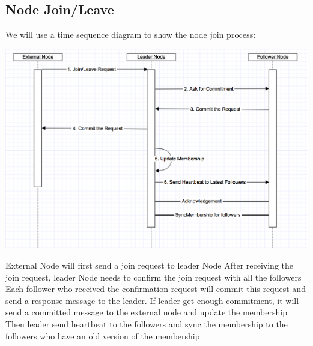 \documentclass[a4paper,11pt]{article}
\begin{document}
\subsection{Node Join/Leave}
We will use a time sequence diagram to show the node join process: 

\begin{center}
    \includegraphics[scale=0.5]{assets/nodeJoin}
\end{center}

\begin{outline}
\1 External Node will first send a join request to leader Node
\1 After receiving the join request, leader Node needs to confirm the join request with all the followers
\1 Each follower who received the confirmation request will commit this request and send a response message to the leader.
\1 If leader get enough commitment, it will send a committed message to the external node and update the membership
\1 Then leader send heartbeat to the followers and sync the membership to the followers who have an old version of the membership
\end{outline}
\end{document}
